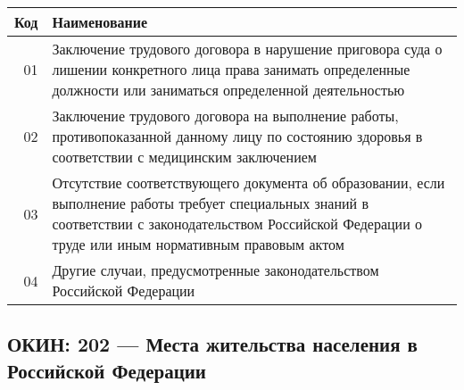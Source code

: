\documentclass[10pt, a4paper, titlepage]{article}
\begin{document}
\begin{center}
    \begin{tabular}{rp{}}
        \hline
        \textbf{Код} & \textbf{Наименование} \\ \hline
        01 & Заключение трудового договора в нарушение приговора  суда о  лишении  конкретного  лица права занимать определенные должности или заниматься определенной деятельностью \\
        02 & Заключение трудового  договора  на   выполнение   работы, противопоказанной  данному  лицу  по состоянию здоровья в соответствии с медицинским заключением \\
        03 & Отсутствие соответствующего   документа  об  образовании, если  выполнение  работы  требует  специальных  знаний  в соответствии  с  законодательством Российской Федерации о труде или иным нормативным правовым актом \\
        04 & Другие случаи,     предусмотренные      законодательством Российской Федерации \\
    \end{tabular}
\end{center}

\subsection{ОКИН: 202 --- Места жительства населения в Российской Федерации}
\end{document}
